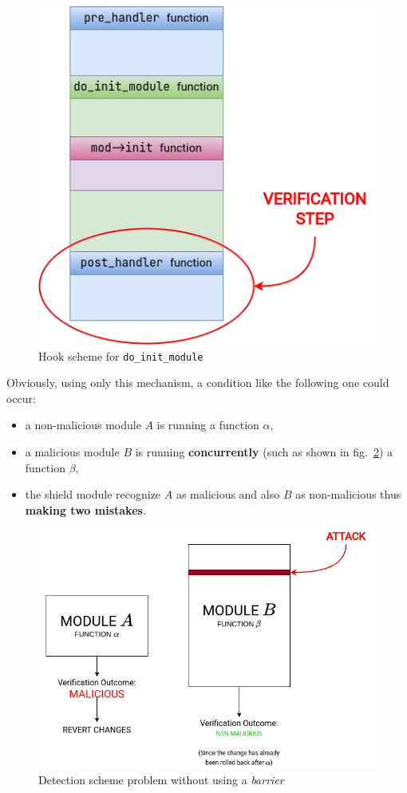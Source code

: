\documentclass{article}
\begin{document}
	\begin{figure}[!htbp]
		\centering
		\includegraphics[scale=0.4]{monitoring}
		\caption{Hook scheme for \texttt{do\_init\_module}}
		\label{fig:monitoring}
	\end{figure}

	Obviously, using only this mechanism, a condition like the following one could occur:
	\begin{itemize}
		\item a non-malicious module $A$ is running a function $\alpha$,
		\item a malicious module $B$ is running \textbf{concurrently} (such as shown in fig.~\ref{fig:concurrency}) a
		function $\beta$,
		\item the shield module recognize $A$ as malicious and also $B$ as non-malicious thus \textbf{making two
		mistakes}.
	\end{itemize}

	\begin{figure}[!htbp]
		\centering
		\includegraphics[scale=0.4]{concurrency}
		\caption{Detection scheme problem without using a \textit{barrier}}
		\label{fig:concurrency}
	\end{figure}
\end{document}
